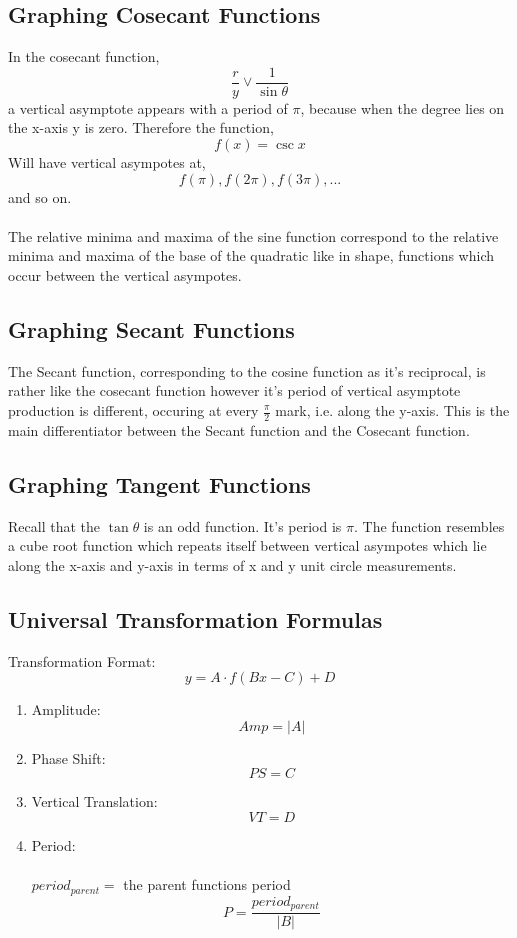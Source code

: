 \documentclass{article}
\begin{document}
\subsection{Graphing Cosecant Functions}
In the cosecant function, 
\[\frac{r}{y}\lor \frac{1}{\sin\theta}\]
a vertical asymptote appears with a period of $\pi$, because when the degree
lies on the x-axis y is zero. Therefore the function, 
\[f(x)=\csc x\]
Will have vertical asympotes at,
\[f(\pi), f(2\pi), f(3\pi),...\]
and so on.\\\\

The relative minima and maxima of the sine function correspond to the
relative minima and maxima of the base of the quadratic like in shape,
functions which occur between the vertical asympotes. 

\subsection{Graphing Secant Functions}
The Secant function, corresponding to the cosine function as it's reciprocal, is
rather like the cosecant function however it's period of vertical asymptote
production is different, occuring at every $\frac{\pi}{2}$ mark, i.e.
along the y-axis. This is the main differentiator between the
Secant function and the Cosecant function.

\subsection{Graphing Tangent Functions}
Recall that the $\tan\theta$ is an odd function. It's period is $\pi$. The
function resembles a cube root function which repeats itself between vertical
asympotes which lie along the x-axis and y-axis in terms of x and y unit circle
measurements.

\subsection{Universal Transformation Formulas} 
Transformation Format:
\[y=A \cdot f(Bx-C)+D\]

\begin{enumerate}
\item Amplitude:\\
  \[Amp = |A|\]

\item Phase Shift:\\
  \[PS = C\]

\item Vertical Translation:\\
  \[VT = D\]

\item Period:\\\\
  $period_{parent}=$ the parent functions period
  \[P = \frac{period_{parent}}{|B|}\]

\end{enumerate}
\end{document}
